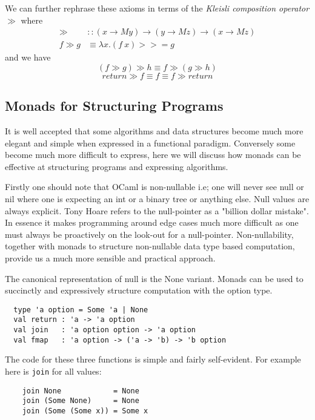 We can further rephrase these axioms in terms
of the \textit{Kleisli composition operator} $\gg$ where
\begin{align}
    \gg &:: (x \rightarrow M y) \rightarrow (y \rightarrow M z) \rightarrow (x \rightarrow M z) \\
    f \gg g &\equiv \lambda x. (f\ x) >>= g
\end{align}
and we have
\begin{equation}
    (f \gg g) \gg h \equiv f \gg (g \gg h)
\end{equation}
\begin{equation}
    return \gg f \equiv f \equiv f \gg return
\end{equation}

\subsection{Monads for Structuring Programs}
It is well accepted that some algorithms and data structures become much more elegant
and simple when expressed in a functional paradigm\cite{okasaki2005alternatives}.
Conversely some become much more difficult to express,
here we will discuss how monads can be effective
at structuring programs and expressing algorithms.

Firstly one should note that OCaml is non-nullable i.e;
one will never see null or nil where one is expecting an
int or a binary tree or anything else.
Null values are always explicit.
Tony Hoare refers to the null-pointer as a
"billion dollar mistake"\cite{bdmistake}.
In essence it makes programming around edge
cases much more difficult as one must always
be proactively on the look-out for a null-pointer.
Non-nullability, together with monads to structure
non-nullable data type based computation,
provide us a much more sensible and practical
approach.

The canonical representation of null is the None variant.
Monads can be used to succinctly and expressively structure computation with the option type.
\begin{verbatim}
  type 'a option = Some 'a | None
  val return : 'a -> 'a option
  val join   : 'a option option -> 'a option
  val fmap   : 'a option -> ('a -> 'b) -> 'b option
\end{verbatim}

The code for these three functions is simple and fairly self-evident.
For example here is \texttt{join} for all values:
\begin{verbatim}
    join None            = None
    join (Some None)     = None
    join (Some (Some x)) = Some x
\end{verbatim}

